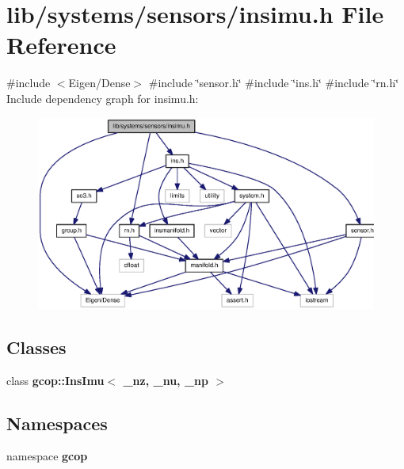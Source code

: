 \section{lib/systems/sensors/insimu.h \-File \-Reference}
\label{insimu_8h}
{\ttfamily \#include $<$\-Eigen/\-Dense$>$}\*
{\ttfamily \#include \char`\"{}sensor.\-h\char`\"{}}\*
{\ttfamily \#include \char`\"{}ins.\-h\char`\"{}}\*
{\ttfamily \#include \char`\"{}rn.\-h\char`\"{}}\*
\-Include dependency graph for insimu.\-h\-:\nopagebreak
\begin{figure}[H]
\begin{center}
\leavevmode
\includegraphics[width=350pt]{insimu_8h__incl}
\end{center}
\end{figure}
\subsection*{\-Classes}
\begin{DoxyCompactItemize}
\item 
class {\bf gcop\-::\-Ins\-Imu$<$ \-\_\-nz, \-\_\-nu, \-\_\-np $>$}
\end{DoxyCompactItemize}
\subsection*{\-Namespaces}
\begin{DoxyCompactItemize}
\item 
namespace {\bf gcop}
\end{DoxyCompactItemize}
